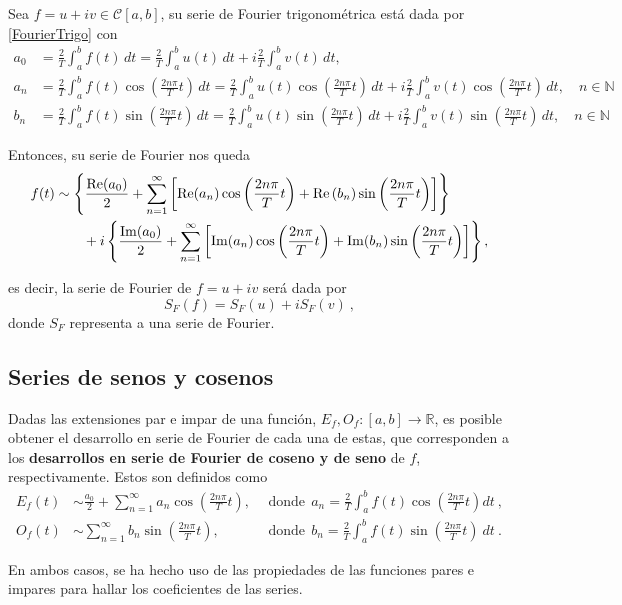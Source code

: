 Sea $f = u + iv \in \mathscr{C}[a,b]$, su serie de Fourier trigonométrica está dada por \eqref{FourierTrigo} con 
\begin{align*}
    a_0 &= \frac{2}{T} \int_{a}^{b} f(t) \,dt =  \frac{2}{T} \int_a^b u(t) \,dt + i\frac{2}{T} \int_a^b v(t) \,dt,\\
    a_n &= \frac{2}{T} \int_a^b f(t) \cos\left( \frac{2n\pi}{T}t \right) \,dt = \frac{2}{T} \int_a^b u(t) \cos\left( \frac{2n\pi}{T}t \right) \,dt + i\frac{2}{T} \int_a^b v(t) \cos\left( \frac{2n\pi}{T}t \right) \,dt , \quad n \in \mathbb{N} \\
    b_n &= \frac{2}{T} \int_a^b f(t) \sin\left( \frac{2n\pi}{T}t \right) \,dt = \frac{2}{T} \int_a^b u(t) \sin\left( \frac{2n\pi}{T}t \right) \,dt + i\frac{2}{T} \int_a^b v(t) \sin\left( \frac{2n\pi}{T}t \right) \,dt, \quad n \in \mathbb{N}
\end{align*}

Entonces, su serie de Fourier nos queda
\begin{align}
  f(t) & \sim   \left\{ \frac{\operatorname{Re}(a_0)}{2} + \sum_{n=1}^{\infty} \left[ \operatorname{Re}(a_n) \cos\left( \frac{2n\pi}{T}t \right) + \operatorname{Re}\left( b_n \right) \sin\left( \frac{2n\pi}{T}t \right) \right] \right\}  \nonumber \\
   & \qquad + i \left\{ \frac{\operatorname{Im}(a_0)}{2} + \sum_{n=1}^{\infty} \left[\operatorname{Im}(a_n) \cos\left( \frac{2n\pi}{T}t \right) + \operatorname{Im}(b_n) \sin\left( \frac{2n\pi}{T}t \right) \right] \right\},
\end{align}

es decir, la serie de Fourier de $f = u + iv$ será dada por
\begin{equation}
    S_F(f) = S_F(u) + i S_F(v) \ ,
\end{equation}
donde $S_F$ representa a una serie de Fourier.


\subsection{Series de senos y cosenos}

\begin{defi} 
    Dadas las extensiones par e impar de una función, $E_f, O_f: [a,b] \to \mathbb{R}$, es posible obtener el desarrollo en serie de Fourier de cada una de estas, que corresponden a los \textbf{desarrollos en serie de Fourier de coseno y de seno} de $f$, respectivamente. Estos son definidos como
    \begin{align*}
        E_f(t) & \sim \frac{a_0}{2}  + \sum_{n=1}^{\infty} a_n \cos\left( \frac{2n\pi}{T}t \right), & ~~\mbox{donde}~~ a_n = \frac{2}{T} \int_a^{b} f(t) \cos\left( \frac{2n\pi}{T}t \right)  dt \ , \\
        O_f(t) & \sim  \sum_{n=1}^{\infty} b_n \sin\left( \frac{2n\pi}{T}t \right), & ~~\mbox{donde} ~~ b_n = \frac{2}{T} \int_a^{b} f(t) \sin\left( \frac{2n\pi}{T}t \right) \ dt \ .
    \end{align*}

    En ambos casos, se ha hecho uso de las propiedades de las funciones pares e impares para hallar los coeficientes de las series.
\end{defi}

